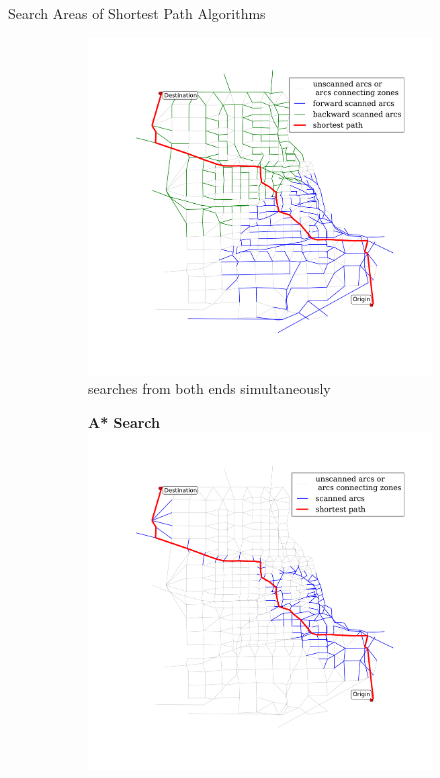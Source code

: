 \documentclass[final]{beamer}
\begin{document}
\begin{frame}{ }
\begin{columns}[t]
\begin{column}{.4\linewidth}
\begin{block}{Search Areas of Shortest Path Algorithms}
\begin{figure}
\begin{subfigure}{.5\linewidth}
                        \includegraphics[width=\linewidth,trim=120px 120px 48px 60px,clip]{img/dijkstra_bidirect}
                        \caption{searches from both ends simultaneously}
                    \vspace{2em}
                    \end{subfigure}
                    \begin{subfigure}{.5\linewidth}
                        \vspace{-1.5em}
                        \centering
                        {\bfseries A* Search}
                        \includegraphics[width=\linewidth,trim=120px 120px 48px 60px,clip]{img/astar}

\end{subfigure}
\end{figure}
\end{block}
\end{column}
\end{columns}
\end{frame}
\end{document}
